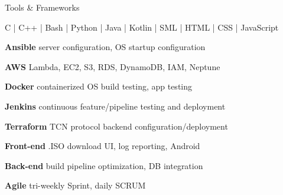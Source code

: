 

\begin{cventries}

  \cventry
    {} %
    {Tools \& Frameworks} %
    {}%
    {} %
    {
      \begin{cvitems} %
        \item { C | C++ | Bash | Python | Java | Kotlin | SML | HTML | CSS | JavaScript}
        \setlength\multicolsep{0pt}
        \begin{multicols}{2}
          \item[] {\textbf{Ansible} server configuration, OS startup configuration}
          \item[] {\textbf{AWS}  Lambda, EC2, S3, RDS, DynamoDB, IAM, Neptune}
          \item[] {\textbf{Docker } containerized OS build testing, app testing  }
          \item[] {\textbf{Jenkins} continuous feature/pipeline testing and deployment}
          \item[] {\textbf{Terraform} TCN protocol backend configuration/deployment}
          \item[] {\textbf{Front-end} .ISO download UI, log reporting, Android}
          \item[] {\textbf{Back-end} build pipeline optimization, DB integration}
          \item[] {\textbf{Agile}  tri-weekly Sprint, daily SCRUM}
        \end{multicols}
      \end{cvitems}
    }

\end{cventries}

